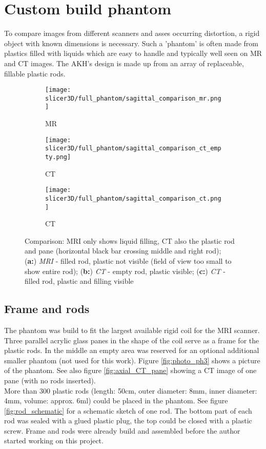 \section{Custom build phantom}

To compare images from different scanners and asses occurring distortion, a rigid object with known dimensions is necessary.
Such a 'phantom' is often made from plastics filled with liquids which are easy to handle and typically well seen on MR and CT images.
The AKH's design is made up from an array of replaceable, fillable plastic rods.

\begin{figure}[!htb]
\centering
  \begin{subfigure}[b]{0.1\textwidth}
    \texttt{[image: slicer3D/full\_phantom/sagittal\_comparison\_mr.png]}
    \caption{MR}
    \label{fig:sagittal_comparison_mr}
  \end{subfigure}
  \begin{subfigure}[b]{0.1\textwidth}
    \texttt{[image: slicer3D/full\_phantom/sagittal\_comparison\_ct\_empty.png]}
    \caption{CT}
    \label{fig:sagittal_comparison_ct_empty}
  \end{subfigure}
  \begin{subfigure}[b]{0.1\textwidth}
    \texttt{[image: slicer3D/full\_phantom/sagittal\_comparison\_ct.png]}
    \caption{CT}
    \label{fig:sagittal_comparison_ct}
  \end{subfigure}
  \caption{Comparison: MRI only shows liquid filling, CT also the plastic rod and pane (horizontal black bar crossing middle and right rod);\\ (\textbf{a:}) \textit{MRI} - filled rod, plastic not visible (field of view too small to show entire rod); (\textbf{b:}) \textit{CT} - empty rod, plastic visible; (\textbf{c:}) \textit{CT} - filled rod, plastic and filling visible}
  \label{fig:sagittal_comparison}
\end{figure}

\subsection{Frame and rods}

The phantom was build to fit the largest available rigid coil for the MRI scanner.
Three parallel acrylic glass panes in the shape of the coil serve as a frame for the plastic rods.
In the middle an empty area was reserved for an optional additional smaller phantom (not used for this work).
Figure \ref{fig:photo_ph3} shows a picture of the phantom. See also figure \ref{fig:axial_CT_pane} showing a CT image of one pane (with no rods inserted). \\
More than 300 plastic rods (length: 50cm, outer diameter: 8mm, inner diameter: 4mm, volume: approx. 6ml) could be placed in the phantom.
See figure \ref{fig:rod_schematic} for a schematic sketch of one rod.
The bottom part of each rod was sealed with a glued plastic plug, the top could be closed with a plastic screw.
Frame and rods were already build and assembled before the author started working on this project.

